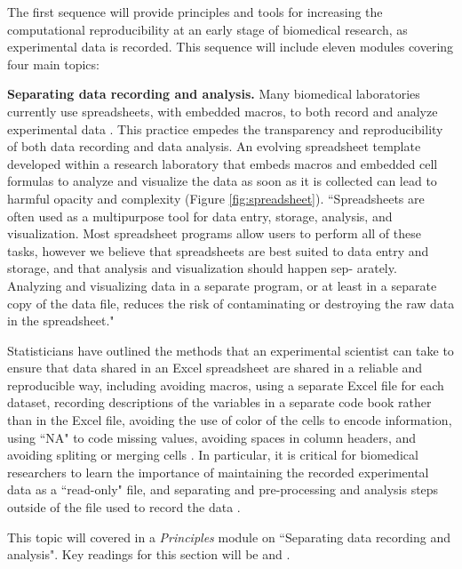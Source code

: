 \documentclass[pdftex,english,11pt,parskip=half]{scrartcl}
\begin{document}
The first sequence will provide principles and tools for increasing the
computational reproducibility at an early stage of biomedical research, as
experimental data is recorded. This sequence will include eleven modules covering
four main topics: 

\textbf{Separating data recording and analysis.} Many biomedical laboratories currently use spreadsheets, with embedded macros, to both record and analyze experimental data \cite{broman2018data}. This practice empedes the transparency and reproducibility of both data recording and data analysis. An evolving spreadsheet template developed within a research laboratory that embeds macros and embedded cell formulas to analyze and visualize the data as soon as it is collected can lead to harmful opacity and complexity (Figure \ref{fig:spreadsheet}). ``Spreadsheets are often used as a multipurpose tool for data entry, storage, analysis, and visualization. Most spreadsheet programs allow users to perform all of these tasks, however we believe that spreadsheets are best suited to data entry and storage, and that analysis and visualization should happen sep- arately. Analyzing and visualizing data in a separate program, or at least in a separate copy of the data file, reduces the risk of contaminating or destroying the raw data in the spreadsheet." \cite{broman2018data} 

Statisticians have outlined the methods that an experimental scientist can take to ensure that data shared in an Excel spreadsheet are shared in a reliable and reproducible way, including avoiding macros, using a separate Excel file for each dataset, recording descriptions of the variables in a separate code book rather than in the Excel file, avoiding the use of color of the cells to encode information, using ``NA" to code missing values, avoiding spaces in column headers, and avoiding spliting or merging cells \cite{ellis2018share, broman2018data}. In particular, it is critical for biomedical researchers to learn the importance of maintaining the recorded experimental data as a ``read-only" file, and separating and pre-processing and analysis steps outside of the file used to record the data \cite{broman2018data, marwick2018packaging}.

This topic will covered in a \textit{Principles} module on ``Separating data
recording and analysis". Key readings for this section will be \cite{broman2018data} and \cite{ellis2018share}.
\end{document}
